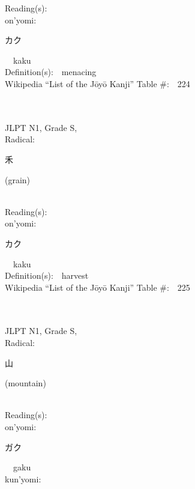 \begin{multicols}{2}
Reading(s):\ \ \\
{\hspace*{1em}}on'yomi:\ \ \\
{\hspace*{2em}}{\begin{CJK}{UTF8}{min} カク \end{CJK}}\ \ kaku\ \ \\
Definition(s):\ \ menacing \\
Wikipedia ``List of the J\=oy\=o Kanji'' Table \#:\ \ 224 \\
\ \ \\
{\fontsize{34pt}{40pt}  }\ \ \\
{JLPT N1, Grade S, \\Radical:\ \ {\begin{CJK}{UTF8}{min} 禾 \end{CJK}} (grain) } \\
Reading(s):\ \ \\
{\hspace*{1em}}on'yomi:\ \ \\
{\hspace*{2em}}{\begin{CJK}{UTF8}{min} カク \end{CJK}}\ \ kaku\ \ \\
Definition(s):\ \ harvest \\
Wikipedia ``List of the J\=oy\=o Kanji'' Table \#:\ \ 225 \\
\ \ \\
{\fontsize{34pt}{40pt}  }\ \ \\
{JLPT N1, Grade S, \\Radical:\ \ {\begin{CJK}{UTF8}{min} 山 \end{CJK}} (mountain) } \\
Reading(s):\ \ \\
{\hspace*{1em}}on'yomi:\ \ \\
{\hspace*{2em}}{\begin{CJK}{UTF8}{min} ガク \end{CJK}}\ \ gaku\ \ \\
{\hspace*{1em}}kun'yomi:\ \ \\

\end{multicols}
